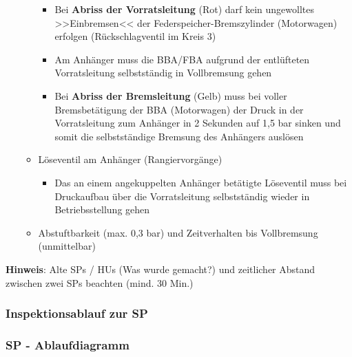 \documentclass{vorlage-design-main}
\begin{document}
\begin{enumerate}
\begin{itemize}
    \begin{itemize}
    
    \item
      Bei \textbf{Abriss der Vorratsleitung} (Rot) darf kein ungewolltes
      >>Einbremsen<< der Federspeicher-Bremszylinder (Motorwagen)
      erfolgen (Rückschlagventil im Kreis 3)
    \item
      Am Anhänger muss die BBA/FBA aufgrund der entlüfteten
      Vorratsleitung selbstständig in Vollbremsung gehen
    \item
      Bei \textbf{Abriss der Bremsleitung} (Gelb) muss bei voller
      Bremsbetätigung der BBA (Motorwagen) der Druck in der
      Vorratsleitung zum Anhänger in 2 Sekunden auf 1,5 bar sinken und
      somit die selbstständige Bremsung des Anhängers auslösen
    \end{itemize}
  \item
    Löseventil am Anhänger (Rangiervorgänge)

    \begin{itemize}
    
    \item
      Das an einem angekuppelten Anhänger betätigte Löseventil muss bei
      Druckaufbau über die Vorratsleitung selbstständig wieder in
      Betriebsstellung gehen
    \end{itemize}
  \item
    Abstuftbarkeit (max. 0,3 bar) und Zeitverhalten bis Vollbremsung
    (unmittelbar)
  \end{itemize}
\end{enumerate}

\textbf{Hinweis}: Alte SPs / HUs (Was wurde gemacht?) und zeitlicher
Abstand zwischen zwei SPs beachten (mind. 30 Min.)

\subsubsection{Inspektionsablauf zur SP}\label{inspektionsablauf-zur-sp}

\subsubsection{SP - Ablaufdiagramm}\label{sp---ablaufdiagramm}
\end{document}
